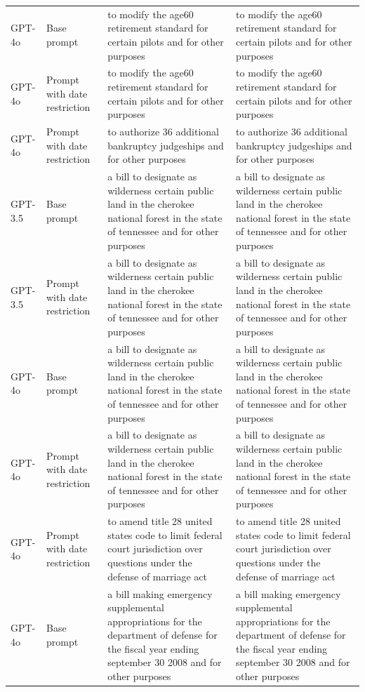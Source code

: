 \begin{longtable}{>{\raggedright\arraybackslash}p{1.4cm}>{\raggedright\arraybackslash}p{1.4cm}>{\raggedright\arraybackslash}p{5.5cm}>{\raggedright\arraybackslash}p{5.5cm}}
GPT-4o & Base prompt & to modify the age60 retirement standard for certain pilots and for other purposes & to modify the age60 retirement standard for certain pilots and for other purposes\\
GPT-4o & Prompt with date restriction & to modify the age60 retirement standard for certain pilots and for other purposes & to modify the age60 retirement standard for certain pilots and for other purposes\\
GPT-4o & Prompt with date restriction & to authorize 36 additional bankruptcy judgeships and for other purposes & to authorize 36 additional bankruptcy judgeships and for other purposes\\
GPT-3.5 & Base prompt & a bill to designate as wilderness certain public land in the cherokee national forest in the state of tennessee and for other purposes & a bill to designate as wilderness certain public land in the cherokee national forest in the state of tennessee and for other purposes\\
GPT-3.5 & Prompt with date restriction & a bill to designate as wilderness certain public land in the cherokee national forest in the state of tennessee and for other purposes & a bill to designate as wilderness certain public land in the cherokee national forest in the state of tennessee and for other purposes\\
GPT-4o & Base prompt & a bill to designate as wilderness certain public land in the cherokee national forest in the state of tennessee and for other purposes & a bill to designate as wilderness certain public land in the cherokee national forest in the state of tennessee and for other purposes\\
GPT-4o & Prompt with date restriction & a bill to designate as wilderness certain public land in the cherokee national forest in the state of tennessee and for other purposes & a bill to designate as wilderness certain public land in the cherokee national forest in the state of tennessee and for other purposes\\
GPT-4o & Prompt with date restriction & to amend title 28 united states code to limit federal court jurisdiction over questions under the defense of marriage act & to amend title 28 united states code to limit federal court jurisdiction over questions under the defense of marriage act\\
GPT-4o & Base prompt & a bill making emergency supplemental appropriations for the department of defense for the fiscal year ending september 30 2008 and for other purposes & a bill making emergency supplemental appropriations for the department of defense for the fiscal year ending september 30 2008 and for other purposes\\

\end{longtable}
